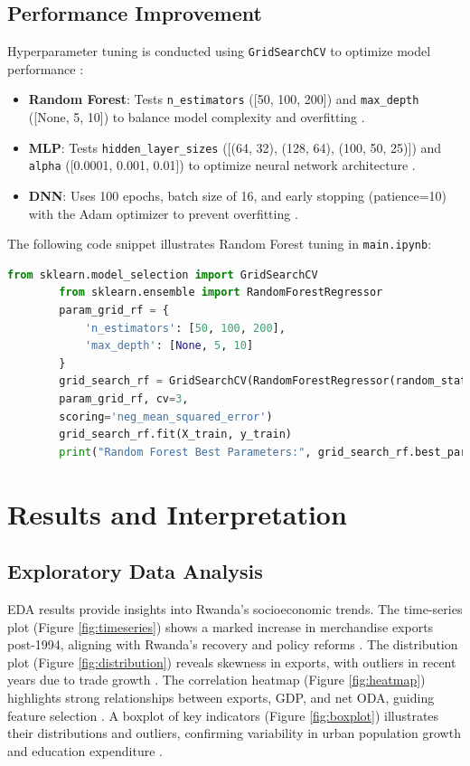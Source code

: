 \documentclass[12pt]{article}
\begin{document}
	\subsection{Performance Improvement}
	Hyperparameter tuning is conducted using \texttt{GridSearchCV} to optimize model performance \citep{scikit-learn}:
	\begin{itemize}
		\item \textbf{Random Forest}: Tests \texttt{n\_estimators} ([50, 100, 200]) and \texttt{max\_depth} ([None, 5, 10]) to balance model complexity and overfitting \citep{breiman}.
		\item \textbf{MLP}: Tests \texttt{hidden\_layer\_sizes} ([(64, 32), (128, 64), (100, 50, 25)]) and \texttt{alpha} ([0.0001, 0.001, 0.01]) to optimize neural network architecture \citep{goodfellow}.
		\item \textbf{DNN}: Uses 100 epochs, batch size of 16, and early stopping (patience=10) with the Adam optimizer to prevent overfitting \citep{tensorflow, kingma_adam}.
	\end{itemize}
	The following code snippet illustrates Random Forest tuning in \texttt{main.ipynb}:
	\begin{lstlisting}[language=Python]
		from sklearn.model_selection import GridSearchCV
		from sklearn.ensemble import RandomForestRegressor
		param_grid_rf = {
			'n_estimators': [50, 100, 200],
			'max_depth': [None, 5, 10]
		}
		grid_search_rf = GridSearchCV(RandomForestRegressor(random_state=42), 
		param_grid_rf, cv=3, 
		scoring='neg_mean_squared_error')
		grid_search_rf.fit(X_train, y_train)
		print("Random Forest Best Parameters:", grid_search_rf.best_params_)
	\end{lstlisting}
	
	\section{Results and Interpretation}
	
	\subsection{Exploratory Data Analysis}
	EDA results provide insights into Rwanda's socioeconomic trends. The time-series plot (Figure \ref{fig:timeseries}) shows a marked increase in merchandise exports post-1994, aligning with Rwanda's recovery and policy reforms \citep{rwanda_vision}. The distribution plot (Figure \ref{fig:distribution}) reveals skewness in exports, with outliers in recent years due to trade growth \citep{wdi}. The correlation heatmap (Figure \ref{fig:heatmap}) highlights strong relationships between exports, GDP, and net ODA, guiding feature selection \citep{hastie}. A boxplot of key indicators (Figure \ref{fig:boxplot}) illustrates their distributions and outliers, confirming variability in urban population growth and education expenditure \citep{seaborn}.
	
\end{document}
